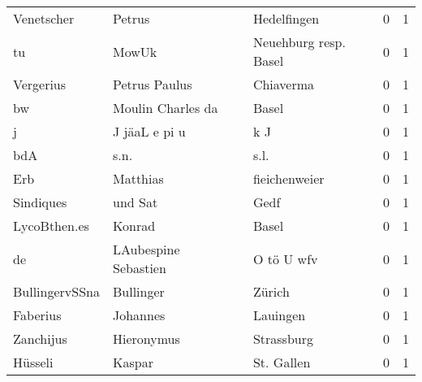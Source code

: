 \documentclass[10pt,a4paper,landscape]{article}
\begin{document}
\begin{longtable}{llllrr}
               Venetscher &                             Petrus &             &                                 Hedelfingen &          0 &         1 \\
                       tu &                              MowUk &             &                       Neuehburg resp. Basel &          0 &         1 \\
                Vergerius &                      Petrus Paulus &             &                                   Chiaverma &          0 &         1 \\
                       bw &                  Moulin Charles da &             &                                       Basel &          0 &         1 \\
                        j &                      J jäaL e pi u &             &                                         k J &          0 &         1 \\
                      bdA &                               s.n. &             &                                        s.l. &          0 &         1 \\
                      Erb &                           Matthias &             &                               fieichenweier &          0 &         1 \\
                Sindiques &                            und Sat &             &                                        Gedf &          0 &         1 \\
             LycoBthen.es &                             Konrad &             &                                       Basel &          0 &         1 \\
                       de &               LAubespine Sebastien &             &                                  O tö U wfv &          0 &         1 \\
           BullingervSSna &                          Bullinger &             &                                      Zürich &          0 &         1 \\
                 Faberius &                           Johannes &             &                                    Lauingen &          0 &         1 \\
                Zanchijus &                         Hieronymus &             &                                  Strassburg &          0 &         1 \\
                  Hüsseli &                             Kaspar &             &                                  St. Gallen &          0 &         1 \\

\end{longtable}
\end{document}
